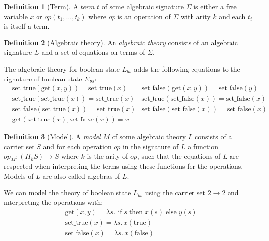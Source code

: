 \documentclass[acmsmall, screen, review, anonymous]{acmart}
\theoremstyle{definition}
\newtheorem{definition}{Definition}[section]
\newcommand{\mif}{\mathop{\mathrm{if}}}
\newcommand{\mthen}{\mathop{\mathrm{then}}}
\newcommand{\melse}{\mathop{\mathrm{else}}}
\begin{document}
\begin{definition}[Term]
  A \emph{term} $t$ of some algebraic signature $\Sigma$ is either a
  free variable $x$ or $op(t_1, \ldots, t_k)$ where $op$ is an operation
  of $\Sigma$ with arity $k$ and each $t_i$ is itself a term.
\end{definition}

\begin{definition}[Algebraic theory]
  An \emph{algebraic theory} consists of an algebraic signature $\Sigma$ and a set of
  equations on terms of $\Sigma$.
\end{definition}

\begin{example}
  The algebraic theory for boolean state $L_{bs}$ adds the following
  equations to the signature of boolean state $\Sigma_{bs}$:
  \begin{align*}
    &\mathrm{set\_true}(\mathrm{get}(x, y)) = \mathrm{set\_true}(x)
    &\mathrm{set\_false}(\mathrm{get}(x, y)) = \mathrm{set\_false}(y) \\
    &\mathrm{set\_true}(\mathrm{set\_true}(x)) = \mathrm{set\_true}(x)
    &\mathrm{set\_true}(\mathrm{set\_false}(x)) = \mathrm{set\_false}(x) \\
    &\mathrm{set\_false}(\mathrm{set\_true}(x)) = \mathrm{set\_true}(x)
    &\mathrm{set\_false}(\mathrm{set\_false}(x)) = \mathrm{set\_false}(x) \\
    &\mathrm{get}(\mathrm{set\_true}(x), \mathrm{set\_false}(x)) = x
  \end{align*}
\end{example}

\begin{definition}[Model]
  A \emph{model} $M$ of some algebraic theory $L$ consists of a carrier
  set $S$ and for each operation $op$ in the signature of $L$ a function
  $op_M : (\Pi_k S) \rightarrow S$ where $k$ is the arity of $op$, such
  that the equations of $L$ are respected when interpreting the terms
  using these functions for the operations. Models of $L$ are also
  called algebras of $L$.
\end{definition}

\begin{example}
  We can model the theory of boolean state $L_{bs}$ using the carrier
  set $2 \rightarrow 2$ and interpreting the operations with:
  \begin{align*}
    &\mathrm{get}(x, y) = \lambda s.\, \mif s \mthen x(s) \melse y(s) \\
    &\mathrm{set\_true}(x) = \lambda s.\, x(\mathrm{true}) \\
    &\mathrm{set\_false}(x) = \lambda s.\, x(\mathrm{false})
  \end{align*}
\end{example}
\end{document}
